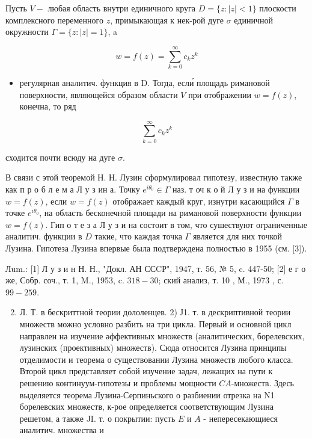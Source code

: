 \documentclass[10pt]{article}
\begin{document}
Пусть $V-$ любая область внутри единичного круга $D=\{z:|z|<1\}$ плоскости комплексного переменного $z$, примыкающая к нек-рой дуге $\sigma$ единичной окружности $\Gamma=\{z:|z|=1\}$, a



\[

w=f(z)=\sum_{k=0}^{\infty} c_{k} z^{k}

\]



\begin{itemize}

  \item регулярная аналитич. функция в D. Тогда, если́ площадь римановой поверхности, являющейся образом области $V$ при отображении $w=f(z)$, конечна, то ряд

\end{itemize}



\[

\sum_{k=0}^{\infty} c_{k} z^{k}

\]



сходится почти всюду на дуге $\sigma$.



В связи с этой теоремой Н. Н. Лузин сформулировал гипотезу, известную также как п р о б л е м а Л у з ин а. Точку $e^{i \theta_{0}} \in \Gamma$ наз. т оч к о й Л у з и на функции $w=f(z)$, если $w=f(z)$ отображает каждый круг, изнутри касающийся $\Gamma$ в точке $e^{i \theta_{0}}$, на область бесконечной площади на римановой поверхности функции $w=f(z)$. Гип о т е з а Л у з и на состоит в том, что сушествуют ограниченные аналитич. функции в $D$ такие, что каждая точка $\Gamma$ является для них точкой Лузина. Гипотеза Лузина впервые была подтверждена полностью в 1955 (см. [3]).



Лum.: [1] Л у з и н Н. Н., "Докл. АН ССCР", 1947, т. 56, № 5, c. 447-50; [2] е г о же, Собр. соч., т. 1, M., 1953, c. $318-30$; ский анализ, т. 10 , М., 1973 , с. $99-259$.



\begin{enumerate}

  \setcounter{enumi}{1}

  \item Л. Т. в бескриттной теории дололенцев. 2) Ј1. т. в дескриптивной теории множеств можно условно разбить на три цикла. Первый и основной цикл направлен на изучение әффективных множеств (аналитических, борелевских, лузинских (проективных) множеств). Сюда относится Лузина принципы отделимости и теорема о существовании Лузина множеств любого класса. Второй цикл представляет собой изучение задач, лежащих на пути к решению континуум-гипотезы и проблемы мощности $C A$-множеств. Здесь выделяется теорема Лузина-Серпиньского о разбиении отрезка на N1 борелевских множеств, к-рое определяется соответствующим Лузина решетом, а также JI. т. о покрытии: пусть $E$ и $A$ - непересекающиеся аналитич. множества и

\end{enumerate}
\end{document}
